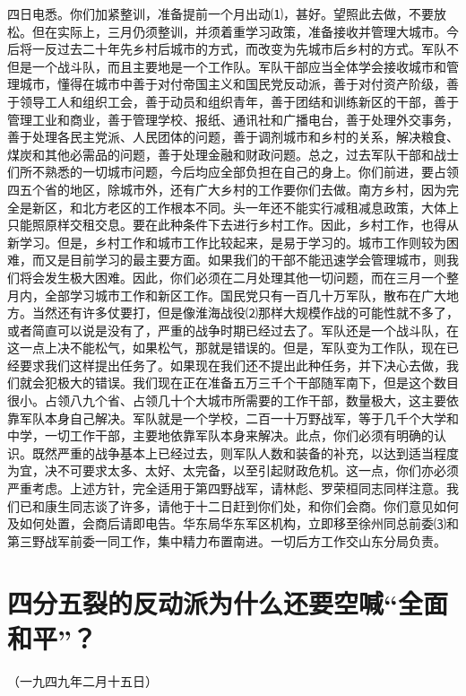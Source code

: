 \documentclass[UTF-8, a5paper, 12pt]{ctexart}
\begin{document}
四日电悉。你们加紧整训，准备提前一个月出动⑴，甚好。望照此去做，不要放松。但在实际上，三月仍须整训，并须着重学习政策，准备接收并管理大城市。今后将一反过去二十年先乡村后城市的方式，而改变为先城市后乡村的方式。军队不但是一个战斗队，而且主要地是一个工作队。军队干部应当全体学会接收城市和管理城市，懂得在城市中善于对付帝国主义和国民党反动派，善于对付资产阶级，善于领导工人和组织工会，善于动员和组织青年，善于团结和训练新区的干部，善于管理工业和商业，善于管理学校、报纸、通讯社和广播电台，善于处理外交事务，善于处理各民主党派、人民团体的问题，善于调剂城市和乡村的关系，解决粮食、煤炭和其他必需品的问题，善于处理金融和财政问题。总之，过去军队干部和战士们所不熟悉的一切城市问题，今后均应全部负担在自己的身上。你们前进，要占领四五个省的地区，除城市外，还有广大乡村的工作要你们去做。南方乡村，因为完全是新区，和北方老区的工作根本不同。头一年还不能实行减租减息政策，大体上只能照原样交租交息。要在此种条件下去进行乡村工作。因此，乡村工作，也得从新学习。但是，乡村工作和城市工作比较起来，是易于学习的。城市工作则较为困难，而又是目前学习的最主要方面。如果我们的干部不能迅速学会管理城市，则我们将会发生极大困难。因此，你们必须在二月处理其他一切问题，而在三月一个整月内，全部学习城市工作和新区工作。国民党只有一百几十万军队，散布在广大地方。当然还有许多仗要打，但是像淮海战役⑵那样大规模作战的可能性就不多了，或者简直可以说是没有了，严重的战争时期已经过去了。军队还是一个战斗队，在这一点上决不能松气，如果松气，那就是错误的。但是，军队变为工作队，现在已经要求我们这样提出任务了。如果现在我们还不提出此种任务，并下决心去做，我们就会犯极大的错误。我们现在正在准备五万三千个干部随军南下，但是这个数目很小。占领八九个省、占领几十个大城市所需要的工作干部，数量极大，这主要依靠军队本身自己解决。军队就是一个学校，二百一十万野战军，等于几千个大学和中学，一切工作干部，主要地依靠军队本身来解决。此点，你们必须有明确的认识。既然严重的战争基本上已经过去，则军队人数和装备的补充，以达到适当程度为宜，决不可要求太多、太好、太完备，以至引起财政危机。这一点，你们亦必须严重考虑。上述方针，完全适用于第四野战军，请林彪、罗荣桓同志同样注意。我们已和康生同志谈了许多，请他于十二日赶到你们处，和你们会商。你们意见如何及如何处置，会商后请即电告。华东局华东军区机构，立即移至徐州同总前委⑶和第三野战军前委一同工作，集中精力布置南进。一切后方工作交山东分局负责。

\section{四分五裂的反动派为什么还要空喊“全面和平”？}

（一九四九年二月十五日）
\end{document}
